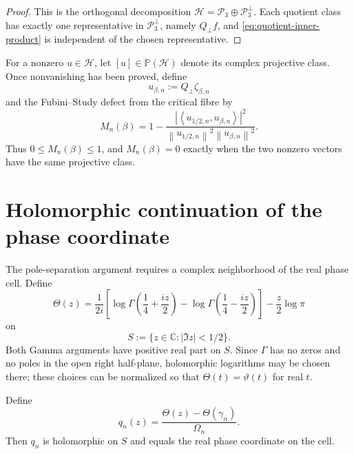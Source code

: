 \documentclass[11pt]{amsart}
\numberwithin{equation}{section}
\newcommand{\C}{\mathbb C}
\newcommand{\Hcal}{\mathcal H}
\newcommand{\Pcal}{\mathcal P}
\newcommand{\ip}[2]{\left\langle #1,#2\right\rangle}
\newcommand{\norm}[1]{\left\lVert #1\right\rVert}
\newcommand{\PP}{\mathbb P}
\begin{document}
\begin{proof}
This is the orthogonal decomposition
$\Hcal=\Pcal_3\oplus\Pcal_3^\perp$.  Each quotient class has exactly one
representative in $\Pcal_3^\perp$, namely $Q_\perp f$, and
\eqref{eq:quotient-inner-product} is independent of the chosen representative.
\end{proof}

For a nonzero $u\in\Hcal$, let $[u]\in\PP(\Hcal)$ denote its complex
projective class.  Once nonvanishing has been proved, define
\begin{equation}
 u_{\beta,n}:=Q_\perp\zeta_{\beta,n}
 \label{eq:u-beta-n}
\end{equation}
and the Fubini--Study defect from the critical fibre by
\begin{equation}
 \boxed{
 M_n(\beta)
 =1-
 \frac{|\ip{u_{1/2,n}}{u_{\beta,n}}|^2}
 {\norm{u_{1/2,n}}^2\norm{u_{\beta,n}}^2}.
 }
 \label{eq:M-definition}
\end{equation}
Thus $0\leq M_n(\beta)\leq1$, and $M_n(\beta)=0$ exactly when the two
nonzero vectors have the same projective class.

\section{Holomorphic continuation of the phase coordinate}
\label{sec:phase-holomorphic}

The pole-separation argument requires a complex neighborhood of the real phase
cell.  Define
\begin{equation}
 \Theta(z)=\frac{1}{2i}\left[
 \log\Gamma\!\left(\frac14+\frac{iz}{2}\right)
 -\log\Gamma\!\left(\frac14-\frac{iz}{2}\right)
 \right]-\frac z2\log\pi
 \label{eq:Theta-complex}
\end{equation}
on
\begin{equation}
 S:=\{z\in\C:|\Im z|<1/2\}.
 \label{eq:S-strip}
\end{equation}
Both Gamma arguments have positive real part on $S$.  Since $\Gamma$ has no
zeros and no poles in the open right half-plane, holomorphic logarithms may be
chosen there; these choices can be normalized so that
$\Theta(t)=\vartheta(t)$ for real $t$.

Define
\begin{equation}
 q_n(z)=\frac{\Theta(z)-\Theta(\gamma_n)}{\Omega_n}.
 \label{eq:q-n-holomorphic}
\end{equation}
Then $q_n$ is holomorphic on $S$ and equals the real phase coordinate on the
cell.
\end{document}
